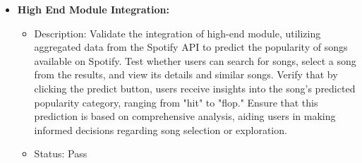 \documentclass[11pt]{report}
\begin{document}
\begin{itemize}
    \item \textbf{High End Module Integration:}
    \begin{itemize}
        \item Description: Validate the integration of high-end module, utilizing aggregated data from the Spotify API to predict the popularity of songs available on Spotify. Test whether users can search for songs, select a song from the results, and view its details and similar songs. Verify that by clicking the predict button, users receive insights into the song's predicted popularity category, ranging from "hit" to "flop." Ensure that this prediction is based on comprehensive analysis, aiding users in making informed decisions regarding song selection or exploration.
        \item Status: Pass
    \end{itemize}    
 \end{itemize}
 
 
 \clearpage
\end{document}
